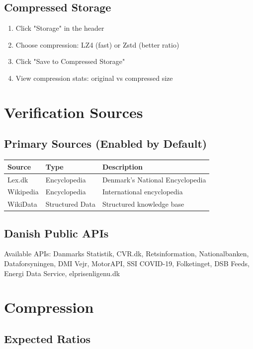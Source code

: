 \documentclass[11pt,a4paper]{article}
\begin{document}
\subsection{Compressed Storage}

\begin{enumerate}
    \item Click "Storage" in the header
    \item Choose compression: LZ4 (fast) or Zstd (better ratio)
    \item Click "Save to Compressed Storage"
    \item View compression stats: original vs compressed size
\end{enumerate}

\section{Verification Sources}

\subsection{Primary Sources (Enabled by Default)}

\begin{tabular}{|l|l|p{5cm}|}
    \hline
    Source & Type & Description \\
    \hline
    Lex.dk & Encyclopedia & Denmark's National Encyclopedia \\
    Wikipedia & Encyclopedia & International encyclopedia \\
    WikiData & Structured Data & Structured knowledge base \\
    \hline
\end{tabular}

\subsection{Danish Public APIs}

Available APIs: Danmarks Statistik, CVR.dk, Retsinformation, Nationalbanken, Dataforsyningen, DMI Vejr, MotorAPI, SSI COVID-19, Folketinget, DSB Feeds, Energi Data Service, elprisenligenu.dk

\section{Compression}

\subsection{Expected Ratios}
\end{document}

